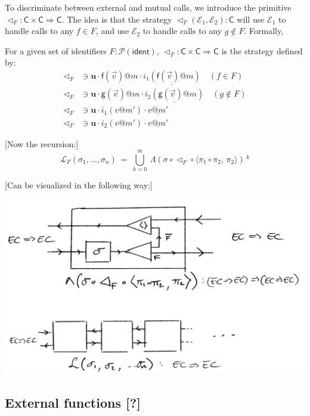 \documentclass[acmsmall,anonymous]{acmart}
\makeatletter
\newcommand{\kw}[1]{\ensuremath{ \textsf{#1} }}
\newcommand{\EC}{\kw{C}}
\newcommand{\mcall}[3]{\kw{#1}({#2})@{#3}}
\newcommand{\mret}[2]{{#1}@{#2}}
\newcommand{\pret}[2]{%
  \underline{\mret{#1}{#2}}%
}
\makeatother
\begin{document}
To discriminate between external and mutual calls,
we introduce the primitive $\lhd_F : \EC \times \EC \Rightarrow \EC$.
The idea is that the strategy $\lhd_F(\mathcal{E}_1, \mathcal{E}_2) : \EC$
will use $\mathcal{E}_1$ to handle calls to any $f \in F$,
and use $\mathcal{E}_2$ to handle calls to any $g \notin F$.
Formally,
\begin{definition}[$\lhd_F$]
For a given set of identifiers $F : \mathcal{P}(\kw{ident})$,
$\lhd_F : \EC \times \EC \Rightarrow \EC$ is the strategy defined by:
\begin{align*}
  \lhd_F &\ni
    \mathbf{u} \cdot
    \mcall{f}{\vec{v}}{m} \cdot
    \underline{i_1(\mcall{f}{\vec{v}}{m})}
    \quad (f \in F) \\
  \lhd_F &\ni
    \mathbf{u} \cdot
    \mcall{g}{\vec{v}}{m} \cdot
    \underline{i_2(\mcall{g}{\vec{v}}{m})}
    \quad (g \notin F) \\
  \lhd_F &\ni
    \mathbf{u} \cdot
    i_1(\mret{v}{m'}) \cdot
    \pret{v}{m'} \\
  \lhd_F &\ni
    \mathbf{u} \cdot
    i_2(\mret{v}{m'}) \cdot
    \pret{v}{m'}
\end{align*}
\end{definition}

[Now the recursion:]
\[
  \mathcal{L}_F(\sigma_1, \ldots, \sigma_n) \ =\ 
    \bigcup_{k=0}^\infty\ 
    \Lambda ( \sigma \circ \lhd_F \circ \langle \pi_1 \circ \pi_2, \, \pi_2 \rangle ) \,^k
\]

[Can be visualized in the following way:]
\begin{center}
  \includegraphics[scale=0.5]{linking-operator}
\end{center}


\subsection{External functions [?]} %
\end{document}
